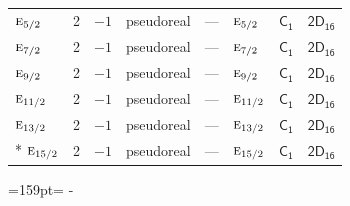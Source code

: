 \documentclass[10pt,a4paper]{article}
\newcommand{\needspace}[1]{\par\penalty-100\begingroup\dimen0=#1\relax\dimen2=\pagegoal
  \advance\dimen2-\pagetotal\ifdim\dimen0>\dimen2\relax\ifdim\dimen2>0pt\vfil\break\fi\fi
  \endgroup}
\numberwithin{equation}{section}
\newcommand{\grp}[1]{\mathsf{#1}}
\newcommand{\irr}[1]{\text{\normalfont\scshape #1}}
\begin{document}
{\begin{longtable}{@{}lrrlllll@{}}
$\irr{e}_{5/2}$ & 2 & $-1$ & pseudoreal & --- & $\irr{e}_{5/2}$ & \href{C1.pdf}{$\grp{C_{1}}$} & $\grp{2D_{16}}$\\
$\irr{e}_{7/2}$ & 2 & $-1$ & pseudoreal & --- & $\irr{e}_{7/2}$ & \href{C1.pdf}{$\grp{C_{1}}$} & $\grp{2D_{16}}$\\
$\irr{e}_{9/2}$ & 2 & $-1$ & pseudoreal & --- & $\irr{e}_{9/2}$ & \href{C1.pdf}{$\grp{C_{1}}$} & $\grp{2D_{16}}$\\
$\irr{e}_{11/2}$ & 2 & $-1$ & pseudoreal & --- & $\irr{e}_{11/2}$ & \href{C1.pdf}{$\grp{C_{1}}$} & $\grp{2D_{16}}$\\
$\irr{e}_{13/2}$ & 2 & $-1$ & pseudoreal & --- & $\irr{e}_{13/2}$ & \href{C1.pdf}{$\grp{C_{1}}$} & $\grp{2D_{16}}$\\*
$\irr{e}_{15/2}$ & 2 & $-1$ & pseudoreal & --- & $\irr{e}_{15/2}$ & \href{C1.pdf}{$\grp{C_{1}}$} & $\grp{2D_{16}}$\\
\bottomrule\end{longtable}}
\needspace{159pt}
\end{document}
